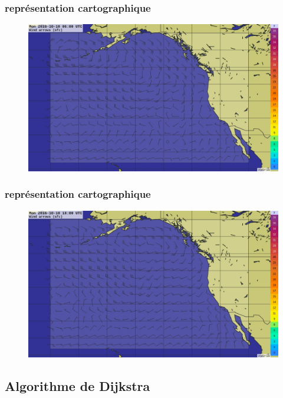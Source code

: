 \documentclass{beamer}
\begin{document}
\begin{frame}\frametitle{représentation cartographique} 
\begin{figure}
\includegraphics[scale=0.4]{grille3.jpg} 
\end{figure}
\end{frame}

\begin{frame}\frametitle{représentation cartographique} 
\begin{figure}
\includegraphics[scale=0.4]{grille4.jpg} 
\end{figure}
\end{frame}


\subsection{Algorithme de Dijkstra}
\end{document}
